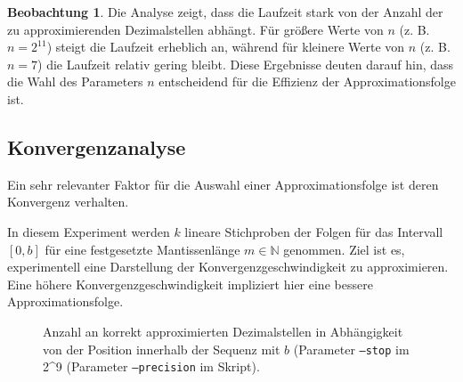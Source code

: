 \documentclass{scrartcl}
\theoremstyle{definition}
\newtheorem{approximation sequence}{Annäherungsfolge}
\newtheorem{observation}{Beobachtung}
\begin{document}
\begin{observation}
    Die Analyse zeigt, dass die Laufzeit stark von der Anzahl der zu approximierenden Dezimalstellen abhängt. Für größere Werte von \(n\) (z. B. \(n = 2^{11}\)) steigt die Laufzeit erheblich an, während für kleinere Werte von \(n\) (z. B. \(n = 7\)) die Laufzeit relativ gering bleibt. Diese Ergebnisse deuten darauf hin, dass die Wahl des Parameters \(n\) entscheidend für die Effizienz der Approximationsfolge ist.
\end{observation}

\subsection{Konvergenzanalyse}

Ein sehr relevanter Faktor für die Auswahl einer Approximationsfolge ist deren
Konvergenz verhalten.

In diesem Experiment werden \(k\) lineare Stichproben der Folgen für das
Intervall \([0, b]\) für eine festgesetzte Mantissenlänge \(m \in \mathbb{N}\)
genommen. Ziel ist es, experimentell eine Darstellung der
Konvergenzgeschwindigkeit zu approximieren. Eine höhere
Konvergenzgeschwindigkeit impliziert hier eine bessere Approximationsfolge.

\begin{figure}[H]
    \centering
    \subfloat[\centering \(b = 10^2\)]{%
        
    }
    \subfloat[\centering \(b = 10^6\)]{%
        
    }
    \caption{%
        Anzahl an korrekt approximierten Dezimalstellen in Abhängigkeit von der
        Position innerhalb der Sequenz mit \(b\) (Parameter \texttt{--stop} im
        2^9\) (Parameter \texttt{--precision} im Skript). }
    \label{fig:convergence-analysis}
\end{figure}
\end{document}
